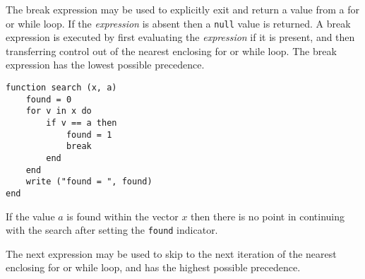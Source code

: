 The {\sc break} expression may be used to explicitly exit and return a
value from a {\sc for} or {\sc while} loop.  If the {\it expression}
is absent then a {\tt null} value is returned.  A {\sc break}
expression is executed by first evaluating the {\it expression} if it
is present, and then transferring control out of the nearest enclosing
{\sc for} or {\sc while} loop.  The {\sc break} expression has the
lowest possible precedence.

\begin{screen}
\begin{verbatim}
function search (x, a)
    found = 0
    for v in x do
        if v == a then
            found = 1
            break
        end
    end
    write ("found = ", found)
end
\end{verbatim}
\end{screen}

If the value $a$ is found within the vector $x$ then there is no point
in continuing with the search after setting the {\tt found} indicator.

The {\sc next} expression may be used to skip to the next iteration
of the nearest enclosing {\sc for} or {\sc while} loop, and has the
highest possible precedence.
